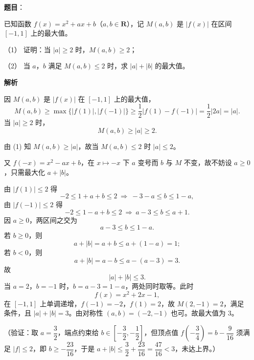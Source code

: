 \begin{answer}

\textbf{题目}：

 已知函数 \(f(x)=x^2+ax+b\)（\(a,b\in\mathbf{R}\)），记 \(M(a,b)\) 是 \(|f(x)|\) 在区间 \([-1,1]\) 上的最大值。

（1） 证明：当 \(|a|\geqslant2\) 时，\(M(a,b)\geqslant2\)；

（2） 当 \(a\)，\(b\) 满足 \(M(a,b)\leqslant2\) 时，求 \(|a|+|b|\) 的最大值。

\textbf{解析}


因 \(M(a,b)\) 是 \(|f(x)|\) 在 \([-1,1]\) 上的最大值，
\nopagebreak[4]
\[
M(a,b)\geqslant\max\{|f(1)|,|f(-1)|\}
\geqslant\frac12|f(1)-f(-1)|
=\frac12|2a|=|a|.
\]
当 \(|a|\geqslant2\) 时，
\nopagebreak[4]
\[
M(a,b)\geqslant|a|\geqslant2.
\]


由 (1) 知 \(M(a,b)\geqslant|a|\)，故当 \(M(a,b)\leqslant2\) 时 \(|a|\leqslant2\)。

又 \(f(-x)=x^2-ax+b\)，在 \(x\mapsto-x\) 下 \(a\) 变号而 \(b\) 与 \(M\) 不变，故不妨设 \(a\geqslant0\)，只需最大化 \(a+|b|\)。

由 \(|f(1)|\leqslant2\) 得
\nopagebreak[4]
\[
-2\leqslant1+a+b\leqslant2
\ \Longrightarrow\ -3-a\leqslant b\leqslant1-a,
\]
由 \(|f(-1)|\leqslant2\) 得
\nopagebreak[4]
\[
-2\leqslant1-a+b\leqslant2
\ \Longrightarrow\ a-3\leqslant b\leqslant a+1.
\]
因 \(a\geqslant0\)，两区间之交为
\nopagebreak[4]
\[
a-3\leqslant b\leqslant1-a.
\]
若 \(b\geqslant0\)，则
\nopagebreak[4]
\[
a+|b|=a+b\leqslant a+(1-a)=1;
\]
若 \(b<0\)，则
\nopagebreak[4]
\[
a+|b|=a-b\leqslant a-(a-3)=3.
\]
故
\nopagebreak[4]
\[
|a|+|b|\leqslant3.
\]
当 \(a=2\)，\(b=-1\) 时，\(b=a-3=1-a\)，两处同时取等。此时
\nopagebreak[4]
\[
f(x)=x^2+2x-1,
\]
在 \([-1,1]\) 上单调递增，\(f(-1)=-2\)，\(f(1)=2\)，故 \(M(2,-1)=2\)，满足条件，且 \(|a|+|b|=3\)。由对称性 \((a,b)=(-2,-1)\) 也可。故最大值为 \(3\)。

（验证：取 \(a=\dfrac32\)，端点约束给 \(b\in\left[-\dfrac32,-\dfrac12\right]\)，但顶点值 \(f\left(-\dfrac34\right)=b-\dfrac{9}{16}\) 须满足 \(|f|\leqslant2\)，即 \(b\geqslant-\dfrac{23}{16}\)，于是 \(a+|b|\leqslant\dfrac32+\dfrac{23}{16}=\dfrac{47}{16}<3\)，未达上界。）



\end{answer}
